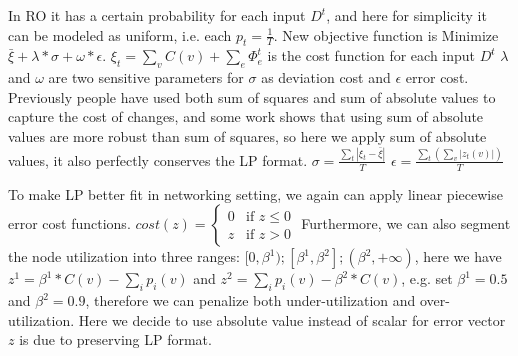\documentclass[twoside,leqno, 11pt]{article}
\begin{document}
In RO it has a certain probability for each input $D^t$, and here for simplicity it can be modeled as uniform, i.e. each $p_t=\frac{1}{T}$.
New objective function is Minimize $ \bar{ \xi} + \lambda *\sigma + \omega*\epsilon  $.
\newline
$\xi_t= \sum\limits_v C(v)+ \sum\limits_e \Phi^t_e$ is the cost function for each input $D^t$\.\newline
$\lambda$ and $\omega$ are two sensitive parameters for  $\sigma$ as deviation cost and $\epsilon$ error cost.\newline
Previously people have used both sum of squares and sum of absolute values to capture the cost of changes, and some work shows that using sum of absolute values are more robust than sum of squares, so here we apply sum of absolute values, it also perfectly conserves the LP format. \newline
$\sigma = \frac{ \sum\limits_t  |\xi_t- \bar{\xi}|}{T}$\newline
$\epsilon= \frac {\sum\limits_t (\sum\limits_v |z_t(v)|)}{T}$

To make LP better fit in networking setting, we again can apply linear piecewise error cost functions.
$
cost(z )=
\left\{
	\begin{array}{ll}
		0  & \mbox{if } z\leq 0 \\
		z & \mbox{if } z > 0 
	\end{array}
\right.
$\newline
Furthermore, we can also segment the node utilization into three ranges: $[0, \beta^1); [\beta^1, \beta^2]; (\beta^2, + \infty)$, here we have $z^1 = \beta^1*C(v)-\sum\limits_i p_i(v) $ and $z^2 =\sum\limits_i p_i(v) -\beta^2*C(v) $, e.g. set $\beta^1 = 0.5$ and $\beta^2 = 0.9$, therefore we can penalize both under-utilization and over-utilization. Here we decide to use absolute value instead of scalar for error vector $z$ is due to preserving LP format. 









\appendix
\end{document}
